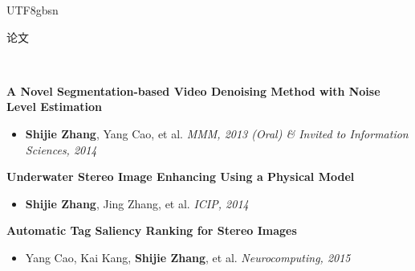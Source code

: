 \documentclass[3pt]{article}
\newenvironment{changemargin}[2]{%
  \begin{list}{}{%
    \setlength{\topsep}{0pt}%
    \setlength{\leftmargin}{#1}%
    \setlength{\rightmargin}{#2}%
    \setlength{\listparindent}{\parindent}%
    \setlength{\itemindent}{\parindent}%
    \setlength{\parsep}{\parskip}%
  }%
  \item[]}{\end{list}
}
\newcommand{\lineover}{
	\begin{changemargin}{-0.05in}{-0.05in}
		\vspace*{-8pt}
		\hrulefill \\
		\vspace*{-2pt}
	\end{changemargin}
}
\newcommand{\header}[1]{
	\begin{changemargin}{-0.5in}{-0.5in}
		{\Large \scshape{#1}}\\
  	\lineover
	\end{changemargin}
}
\newenvironment{body} {
	\vspace*{-16pt}
	\begin{changemargin}{-0.25in}{-0.5in}
  }	
	{\end{changemargin}
}
\begin{document}
\begin{CJK}{UTF8}{gbsn}

%	


 
	

\bigskip

\header{论文}

\begin{body}
	\vspace{18pt}	

	\textbf{ A Novel Segmentation-based Video Denoising Method with Noise Level Estimation }
     \begin{itemize} \itemsep -0pt
	\item{\textbf{Shijie Zhang}, Yang Cao, et al. } \hfill \emph{MMM, 2013 (Oral) \& Invited to Information Sciences, 2014  }
           \end{itemize}	

	\textbf{ Underwater Stereo Image Enhancing Using a Physical Model }
     \begin{itemize} \itemsep -0pt
	\item{\textbf{Shijie Zhang}, Jing Zhang, et al. } \hfill \emph{ICIP, 2014 }
           \end{itemize}	

	\textbf{ Automatic Tag Saliency Ranking for Stereo Images}
     \begin{itemize} \itemsep -0pt
	\item{Yang Cao, Kai Kang, \textbf{Shijie Zhang}, et al. } \hfill \emph{Neurocomputing, 2015  }
           \end{itemize}	

\end{body}

\end{CJK}
\end{document}
